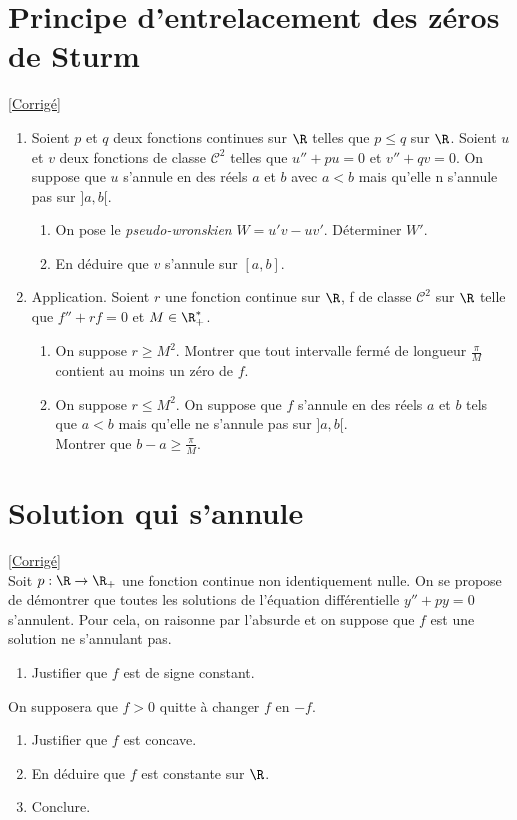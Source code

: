 \documentclass{book}
\begin{document}
\section{Principe d'entrelacement des zéros de Sturm}
\textcolor{blue}{\hyperref[sec:principe-dentrelacement-des-zeros-de-sturm]{[Corrigé]}}\\
\label{Principe d'entrelacement des zéros de Sturm}
\begin{enumerate}[leftmargin=*]
	\item Soient $p$ et $q$ deux fonctions continues sur $\R$ telles que $p\leq q$ sur $\R$. Soient $u$ et $v$ deux fonctions de classe $\mathcal C^2$ telles que $u''+pu=0$ et $v''+qv=0$. On suppose que $u$ s'annule en des réels $a$ et $b$ avec $a<b$ mais qu'elle n s'annule pas sur $]a,b[$.
	\begin{enumerate}[label=\alph*.]
		\item On pose le \textit{pseudo-wronskien} $W=u'v-uv'$. Déterminer $W'$.
		\item En déduire que $v$ s'annule sur $[a,b]$.
	\end{enumerate}
	\item Application. Soient $r$ une fonction continue sur $\R$, f de classe $\mathcal{C^2}$ sur $\R$ telle que $f''+rf=0$ et $M\in\R^*_+$.
	\begin{enumerate}[label=\alph*]
		\item On suppose $r\geq M^2$. Montrer que tout intervalle fermé de longueur $\displaystyle\frac{\pi}{M}$ contient au moins un zéro de $f$.
		\item On suppose $r\leq M^2$. On suppose que $f$ s'annule en des réels $a$ et $b$ tels que $a<b$ mais qu'elle ne s'annule pas sur $]a,b[$.\\
		Montrer que $b-a\geq\displaystyle\frac{\pi}{M}$.
	\end{enumerate}
\end{enumerate}

\section{Solution qui s'annule}
\textcolor{blue}{\hyperref[sec:solution-qui-sannule]{[Corrigé]}}\\
\label{Solution qui s'annule}
Soit $p:\R\to\R_+$ une fonction continue non identiquement nulle. On se propose de démontrer que toutes les solutions de l'équation différentielle $y''+py=0$ s'annulent. Pour cela, on raisonne par l'absurde et on suppose que $f$ est une solution ne s'annulant pas.
\begin{enumerate}
	\item Justifier que $f$ est de signe constant.
\end{enumerate}
On supposera que $f>0$ quitte à changer $f$ en $-f$.
\begin{enumerate}[resume]
	\item Justifier que $f$ est concave.
	\item En déduire que $f$ est constante sur $\R$.
	\item Conclure.
\end{enumerate}
\end{document}
